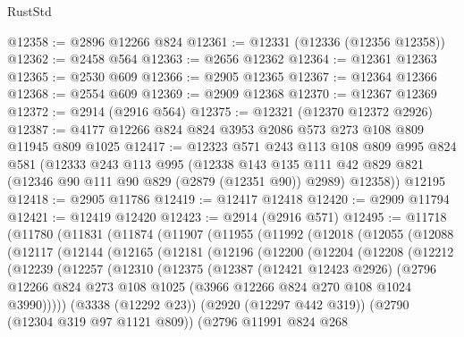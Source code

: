 \begin{lexlean}{RustStd}
\begin{coremodule}
@12358 := @2896 @12266 @824
@12361 := @12331 (@12336 (@12356 @12358))
@12362 := @2458 @564
@12363 := @2656 @12362
@12364 := @12361 @12363
@12365 := @2530 @609
@12366 := @2905 @12365
@12367 := @12364 @12366
@12368 := @2554 @609
@12369 := @2909 @12368
@12370 := @12367 @12369
@12372 := @2914 (@2916 @564)
@12375 := @12321 (@12370 @12372 @2926)
@12387 := @4177 @12266 @824 @824 @3953 @2086 @573 @273 @108 @809 @11945 @809 @1025
@12417 := @12323
    @571
    @243
    @113
    @108
    @809
    @995
    @824
    @581
    (@12333
      @243
      @113
      @995
      (@12338
        @143
        @135
        @111
        @42
        @829
        @821
        (@12346 @90 @111 @90 @829 (@2879 (@12351 @90)) @2989)
        @12358))
    @12195
@12418 := @2905 @11786
@12419 := @12417 @12418
@12420 := @2909 @11794
@12421 := @12419 @12420
@12423 := @2914 (@2916 @571)
@12495 := @11718
    (@11780
      (@11831
        (@11874
          (@11907
            (@11955
              (@11992
                (@12018
                  (@12055
                    (@12088
                      (@12117
                        (@12144
                          (@12165
                            (@12181
                              (@12196
                                (@12200
                                  (@12204
                                    (@12208
                                      (@12212
                                        (@12239
                                          (@12257
                                            (@12310
                                              (@12375
                                                (@12387
                                                  (@12421 @12423 @2926)
                                                  (@2796
                                                    @12266
                                                    @824
                                                    @273
                                                    @108
                                                    @1025
                                                    (@3966 @12266 @824 @270 @108 @1024 @3990)))))
                                            (@3338 (@12292 @23))
                                            (@2920 (@12297 @442 @319))
                                            (@2790 (@12304 @319 @97 @1121 @809))
                                            (@2796
                                              @11991
                                              @824
                                              @268

\end{coremodule}
\end{lexlean}
